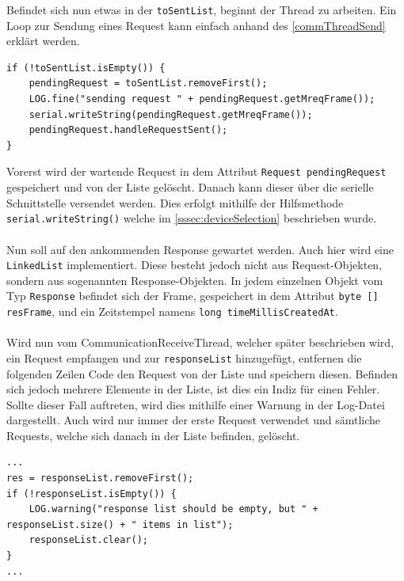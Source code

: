 Befindet sich nun etwas in der \lstinline[style=java]{toSentList}, beginnt der Thread zu arbeiten.
Ein Loop zur Sendung eines Request kann einfach anhand des \autoref{commThreadSend} erklärt werden.
\begin{lstlisting}[style=java,caption=Teilabschnitt CommunicationSendThread,label=commThreadSend]
if (!toSentList.isEmpty()) {
    pendingRequest = toSentList.removeFirst();
    LOG.fine("sending request " + pendingRequest.getMreqFrame());
    serial.writeString(pendingRequest.getMreqFrame());
    pendingRequest.handleRequestSent();
}
\end{lstlisting}
Vorerst wird der wartende Request in dem Attribut \lstinline[style=java]{Request pendingRequest} gespeichert und von der Liste gelöscht.
Danach kann dieser über die serielle Schnittstelle versendet werden.
Dies erfolgt mithilfe der Hilfsmethode \lstinline[style=java]{serial.writeString()} welche im \autoref{sssec:deviceSelection} beschrieben wurde.\\\\
Nun soll auf den ankommenden Response gewartet werden.
Auch hier wird eine \lstinline[style=java]{LinkedList} implementiert.
Diese besteht jedoch nicht aus Request-Objekten, sondern aus sogenannten Response-Objekten.
In jedem einzelnen Objekt vom Typ \lstinline[style=java]{Response} befindet sich der Frame, gespeichert in dem Attribut \lstinline[style=java]{byte [] resFrame}, und ein Zeitstempel namens \lstinline[style=java]{long timeMillisCreatedAt}.\\\\
Wird nun vom CommunicationReceiveThread, welcher später beschrieben wird, ein Request empfangen und zur \lstinline[style=java]{responseList} hinzugefügt, entfernen die folgenden Zeilen Code den Request von der Liste und speichern diesen.
Befinden sich jedoch mehrere Elemente in der Liste, ist dies ein Indiz für einen Fehler.
Sollte dieser Fall auftreten, wird dies mithilfe einer Warnung in der Log-Datei dargestellt.
Auch wird nur immer der erste Request verwendet und sämtliche Requests, welche sich danach in der Liste befinden, gelöscht.
\begin{lstlisting}[style=java,caption=Teilabschnitt CommunicationSendThread,label=commThreadSend]
...
res = responseList.removeFirst();
if (!responseList.isEmpty()) {
    LOG.warning("response list should be empty, but " + responseList.size() + " items in list");
    responseList.clear();
}
...
\end{lstlisting}
